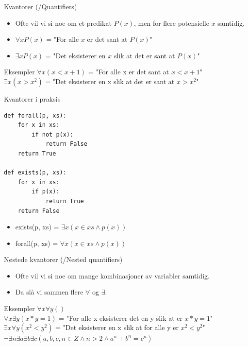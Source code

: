 \begin{frame}{Kvantorer (/Quantifiers)}
    \begin{itemize}
        \item Ofte vil vi si noe om et predikat $P(x)$, men for flere potensielle $x$ samtidig.
        \item $\forall x P(x)$ = "For alle $x$ er det sant at $P(x)$"
        \item $\exists x P(x)$ = "Det eksisterer en $x$ slik at det er sant at $P(x)$"
    \end{itemize}
    
    \begin{block}{Eksempler}
        $\forall x (x < x + 1)$ = "For alle x er det sant at $x < x +1$"\\[5mm]
        $\exists x (x > x^2)$ = "Det eksisterer en x slik at det er sant at $x > x^2$"
    \end{block}
\end{frame}

\begin{frame}[fragile]{Kvantorer i praksis}
    \begin{verbatim}
def forall(p, xs):
    for x in xs:
        if not p(x):
            return False
    return True
    
def exists(p, xs):
    for x in xs:
        if p(x):
            return True
    return False
    \end{verbatim}
    
    \begin{itemize}
        \item exists(p, xs) = $\exists x (x \in xs \land p(x))$
        \item forall(p, xs) = $\forall x (x \in xs \land p(x))$
    \end{itemize}
\end{frame}

\begin{frame}{Nøstede kvantorer (/Nested quantifiers)}
    \begin{itemize}
        \item Ofte vil vi si noe om mange kombinasjoner av variabler samtidig.
        \item Da slå vi sammen flere $\forall$ og $\exists$.
    \end{itemize}
    
    \begin{block}{Eksempler}
        $\forall x \forall y ()$ \\
        $\forall x \exists y (x * y = 1)$ = "For alle x eksisterer det en y slik at er $x * y = 1$" \\
        $\exists x \forall y (x^2 < y^2)$ = "Det eksisterer en x slik at for alle y er $x^2 < y^2$"\\
        $\lnot \exists n \exists a \exists b \exists c (a,b,c,n \in Z \land n > 2 \land a^n + b^n = c^n)$
    \end{block}
\end{frame}

